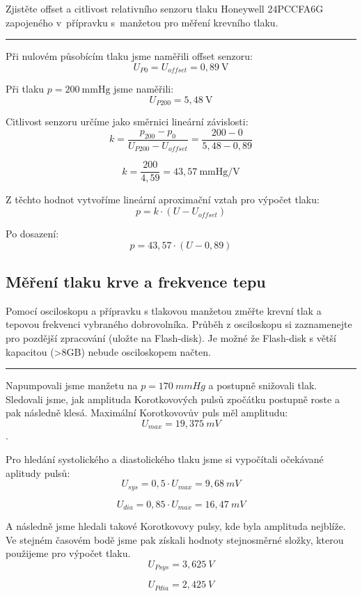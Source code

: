 \documentclass[a4paper,12pt]{article}
\begin{document}
Zjistěte offset a citlivost relativního senzoru tlaku Honeywell 24PCCFA6G zapojeného
v~přípravku s~manžetou pro měření krevního tlaku.

\par\noindent\rule{\textwidth}{0.4pt}

Při nulovém působícím tlaku jsme naměřili offset senzoru:
$$
U_{P0} = U_{offset} = 0{,}89\ \mathrm{V}
$$

Při tlaku $p = 200\ \mathrm{mmHg}$ jsme naměřili:
$$
U_{P200} = 5{,}48\ \mathrm{V}
$$

Citlivost senzoru určíme jako směrnici lineární závislosti:
$$
k = \frac{p_{200} - p_0}{U_{P200} - U_{offset}} = \frac{200 - 0}{5{,}48 - 0{,}89}
$$

$$
k = \frac{200}{4{,}59} = 43{,}57\ \mathrm{mmHg/V}
$$

Z těchto hodnot vytvoříme lineární aproximační vztah pro výpočet tlaku:
$$
p = k \cdot (U - U_{offset})
$$

Po dosazení:
$$
p = 43{,}57 \cdot (U - 0{,}89)
$$

\subsection{Měření tlaku krve a frekvence tepu}

Pomocí osciloskopu a přípravku s tlakovou manžetou změřte krevní tlak a tepovou frekvenci
vybraného dobrovolníka. Průběh z osciloskopu si zaznamenejte pro pozdější zpracování (uložte
na Flash-disk). Je možné že Flash-disk s větší kapacitou (>8GB) nebude osciloskopem načten.

\par\noindent\rule{\textwidth}{0.4pt}

Napumpovali jsme manžetu na $p = 170\ mmHg$ a postupně snižovali tlak. Sledovali jsme, jak amplituda Korotkovových pulsů zpočátku postupně roste a pak následně klesá. Maximální Korotkovovův puls měl amplitudu: 
$$
U_{max} = 19,375\ mV
$$.

Pro hledání systolického a diastolického tlaku jsme si vypočítali očekávané aplitudy pulsů:
$$
U_{sys} = 0,5\cdot U_{max} = 9,68\ mV
$$

$$
U_{dia} = 0,85\cdot U_{max} = 16,47\ mV
$$

A následně jsme hledali takové Korotkovovy pulsy, kde byla amplituda nejblíže. Ve stejném časovém bodě jsme pak získali hodnoty stejnosměrné složky, kterou použijeme pro výpočet tlaku.
$$
U_{Psys} = 3,625\ V
$$

$$
U_{Pdia} = 2,425\ V
$$
\end{document}
